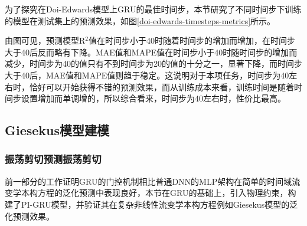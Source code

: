 为了探究在Doi-Edwards模型上GRU的最佳时间步，本节研究了不同时间步下训练的模型在测试集上的预测效果，如图\ref{doi-edwards-timesteps-metrics}所示。

由图可见，预测模型R$^2$值在时间步小于40时随着时间步的增加而增加，在时间步大于40后反而略有下降。MAE值和MAPE值在时间步小于40时随时间步的增加而减少，时间步为40的值只有不到时间步为20的值的十分之一，显著下降，而时间步大于40后，MAE值和MAPE值则趋于稳定。这说明对于本项任务，时间步为40左右时，恰好可以开始获得不错的预测效果，而从训练成本来看，训练时间是随着时间步设置增加而单调增的，所以综合看来，时间步为40左右时，性价比最高。



\subsection{Giesekus模型建模}
\subsubsection{振荡剪切预测振荡剪切}
前一部分的工作证明GRU的门控机制相比普通DNN的MLP架构在简单的时间域流变学本构方程的泛化预测中表现良好，本节在GRU的基础上，引入物理约束，构建了PI-GRU模型，并验证其在复杂非线性流变学本构方程例如Giesekus模型的泛化预测效果。

